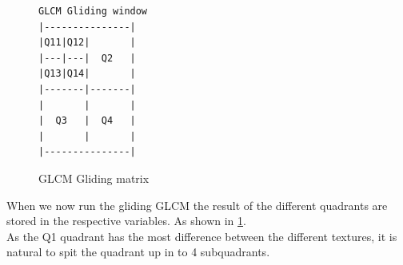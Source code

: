 \documentclass{article}
\begin{document}
	\begin{figure}[h]
	\centering
	\begin{BVerbatim}
GLCM Gliding window
|---------------|
|Q11|Q12|       |
|---|---|  Q2   |
|Q13|Q14|       |
|-------|-------|
|       |       |
|  Q3   |  Q4   |
|       |       |
|---------------|
	\end{BVerbatim}
	\caption{GLCM Gliding matrix}%
	\label{verb:gGLCM}
	\end{figure}


When we now run the gliding GLCM the result of the different quadrants are stored in the respective variables. As shown in \ref{verb:gGLCM}.\\

As the Q1 quadrant has the most difference between the different textures, it is natural to spit the quadrant up in to 4 subquadrants. 

\end{document}
